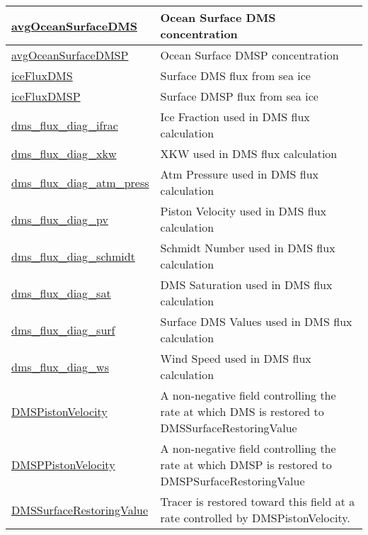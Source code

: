 {\begin{center}
\begin{longtable}{| p{2.0in} | p{4.0in} |}
    \hline
    \hyperref[subsec:var_sec_forcing_avgOceanSurfaceDMS]{avgOceanSurfaceDMS} & Ocean Surface DMS concentration \\
    \hline
    \hyperref[subsec:var_sec_forcing_avgOceanSurfaceDMSP]{avgOceanSurfaceDMSP} & Ocean Surface DMSP concentration \\
    \hline
    \hyperref[subsec:var_sec_forcing_iceFluxDMS]{iceFluxDMS} & Surface DMS flux from sea ice \\
    \hline
    \hyperref[subsec:var_sec_forcing_iceFluxDMSP]{iceFluxDMSP} & Surface DMSP flux from sea ice \\
    \hline
    \hyperref[subsec:var_sec_forcing_dms_flux_diag_ifrac]{dms\_flux\_diag\_ifrac} & Ice Fraction used in DMS flux calculation \\
    \hline
    \hyperref[subsec:var_sec_forcing_dms_flux_diag_xkw]{dms\_flux\_diag\_xkw} & XKW used in DMS flux calculation \\
    \hline
    \hyperref[subsec:var_sec_forcing_dms_flux_diag_atm_press]{dms\_flux\_diag\_atm\_press} & Atm Pressure used in DMS flux calculation \\
    \hline
    \hyperref[subsec:var_sec_forcing_dms_flux_diag_pv]{dms\_flux\_diag\_pv} & Piston Velocity used in DMS flux calculation \\
    \hline
    \hyperref[subsec:var_sec_forcing_dms_flux_diag_schmidt]{dms\_flux\_diag\_schmidt} & Schmidt Number used in DMS flux calculation \\
    \hline
    \hyperref[subsec:var_sec_forcing_dms_flux_diag_sat]{dms\_flux\_diag\_sat} & DMS Saturation used in DMS flux calculation \\
    \hline
    \hyperref[subsec:var_sec_forcing_dms_flux_diag_surf]{dms\_flux\_diag\_surf} & Surface DMS Values used in DMS flux calculation \\
    \hline
    \hyperref[subsec:var_sec_forcing_dms_flux_diag_ws]{dms\_flux\_diag\_ws} & Wind Speed used in DMS flux calculation \\
    \hline
    \hyperref[subsec:var_sec_forcing_DMSPistonVelocity]{DMSPistonVelocity} & A non-negative field controlling the rate at which DMS is restored to DMSSurfaceRestoringValue \\
    \hline
    \hyperref[subsec:var_sec_forcing_DMSPPistonVelocity]{DMSPPistonVelocity} & A non-negative field controlling the rate at which DMSP is restored to DMSPSurfaceRestoringValue \\
    \hline
    \hyperref[subsec:var_sec_forcing_DMSSurfaceRestoringValue]{DMSSurfaceRestoringValue} & Tracer is restored toward this field at a rate controlled by DMSPistonVelocity. \\

\end{longtable}
\end{center}}
